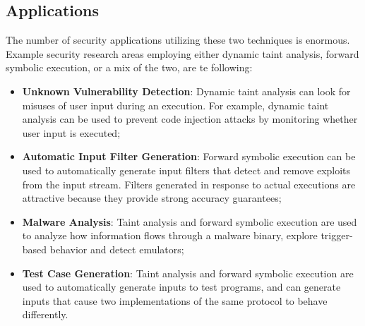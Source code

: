 \subsection{Applications}
The number of security applications utilizing these two techniques is enormous. Example security research areas employing either dynamic taint analysis, forward symbolic execution, or a mix of the two, are te following:
\begin{itemize}
	\item \textbf{Unknown Vulnerability Detection}: Dynamic taint analysis can look for misuses of user input during an execution. For example, dynamic taint analysis can be used to prevent code injection attacks by monitoring whether user input is executed;
	\item \textbf{Automatic Input Filter Generation}: Forward symbolic 	execution can be used to automatically generate input filters that detect and remove exploits from the input stream. Filters generated in response to actual executions are attractive because they provide strong accuracy guarantees;
	\item \textbf{Malware Analysis}: Taint analysis and forward symbolic execution are used to analyze how information flows through a malware binary, explore trigger-based behavior and detect emulators;
	\item \textbf{Test Case Generation}: Taint analysis and forward symbolic execution are used to automatically generate inputs to test programs, and can generate inputs that cause two implementations of the same protocol to behave differently.
\end{itemize}
